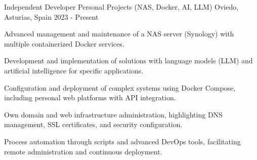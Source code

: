 
\begin{cventries}

  \cventry
    {Independent Developer} %
    {Personal Projects (NAS, Docker, AI, LLM)} %
    {Oviedo, Asturias, Spain} %
    {2023 - Present} %
    {
      \begin{cvitems} %
        \item {Advanced management and maintenance of a NAS server (Synology) with multiple containerized Docker services.}
        \item {Development and implementation of solutions with language models (LLM) and artificial intelligence for specific applications.}
        \item {Configuration and deployment of complex systems using Docker Compose, including personal web platforms with API integration.}
        \item {Own domain and web infrastructure administration, highlighting DNS management, SSL certificates, and security configuration.}
        \item {Process automation through scripts and advanced DevOps tools, facilitating remote administration and continuous deployment.}
      \end{cvitems}
    }

\end{cventries}
